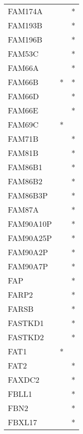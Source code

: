 \begin{longtable}{lcc}
FAM174A         &                &          * \\
FAM193B         &                &          * \\
FAM196B         &                &          * \\
FAM53C          &                &          * \\
FAM66A          &                &          * \\
FAM66B          &              * &          * \\
FAM66D          &                &          * \\
FAM66E          &                &          * \\
FAM69C          &              * &            \\
FAM71B          &                &          * \\
FAM81B          &                &          * \\
FAM86B1         &                &          * \\
FAM86B2         &                &          * \\
FAM86B3P        &                &          * \\
FAM87A          &                &          * \\
FAM90A10P       &                &          * \\
FAM90A25P       &                &          * \\
FAM90A2P        &                &          * \\
FAM90A7P        &                &          * \\
FAP             &                &          * \\
FARP2           &                &          * \\
FARSB           &                &          * \\
FASTKD1         &                &          * \\
FASTKD2         &                &          * \\
FAT1            &              * &            \\
FAT2            &                &          * \\
FAXDC2          &                &          * \\
FBLL1           &                &          * \\
FBN2            &                &          * \\
FBXL17          &                &          * \\

\end{longtable}
